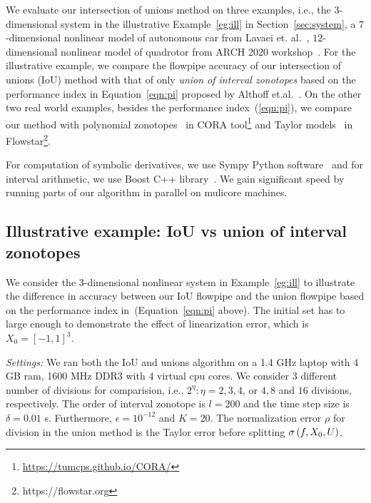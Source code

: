 We evaluate our intersection of unions method on three examples, i.e.,
the $3$-dimensional system in the illustrative Example~\ref{eg:ill} in
Section~\ref{sec:system}, a $7$-dimensional nonlinear model of autonomous car
from Lavaei et. al.~\cite{lavaei2020formal}, $12$-dimensional
nonlinear model of quadrotor from ARCH 2020
workshop~\cite{geretti2020arch}.  For the illustrative example, we
compare the flowpipe accuracy of our intersection of unions (IoU)
method with that of only
\emph{union of interval zonotopes} based on the performance index in
Equation~\ref{eqn:pi} proposed by Althoff
et.al.~\cite{althoff2008reachability}.  
On the other two real world
examples, besides the performance index~(\ref{eqn:pi}), we compare our
method with polynomial
zonotopes~\cite{althoff2013reachability} in CORA
tool\footnote{\url{https://tumcps.github.io/CORA/}} and Taylor
models~\cite{chen2012taylor} in
Flowstar\footnote{https://flowstar.org}.


For computation of symbolic derivatives, we use Sympy Python
software~\cite{10.7717/peerj-cs.103} and for interval arithmetic, we
use Boost C++ library~\cite{bronnimann2006design}.  We gain
significant speed by running parts of our algorithm in
parallel on mulicore machines.

\subsection{Illustrative example: IoU  vs union of interval zonotopes}
We consider the 3-dimensional nonlinear system in Example~\ref{eg:ill}
to illustrate the difference in accuracy between our IoU flowpipe and
the union flowpipe based on the performance index
in~\cite{althoff2008reachability}(Equation~\ref{eqn:pi} above).  The
initial set has to large enough to demonstrate the effect of
linearization error, which is $X_0 = [-1,1]^3$.

\emph{Settings:}  We ran both the IoU and unions algorithm on a 1.4 GHz
laptop with 4 GB ram, 1600 MHz DDR3 with 4 virtual cpu cores.  We
consider 3 different number of divisions for comparision, i.e.,
$2^\eta:\eta = 2, 3,4$, or $4, 8$ and $16$ divisions,
respectively. The order of interval zonotope is $l = 200$ and the time
step size is $\delta = 0.01$ s.  Furthermore, $\epsilon = 10^{-12}$
and $K = 20$.  The normalization error $\rho$ for division in the union method is
the Taylor error before splitting $\sigma\left(f,X_0,U\right)$.

